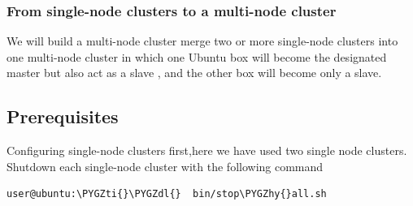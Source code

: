 \documentclass[letterpaper,10pt,english]{sphinxmanual}
\def\PYGZdl{\char`\$}
\def\PYGZhy{\char`\-}
\def\PYGZti{\char`\~}
\begin{document}
\subsubsection{From single-node clusters to a multi-node cluster}
\label{hadoop:from-single-node-clusters-to-a-multi-node-cluster}
We will build a multi-node cluster merge two or more single-node clusters into one multi-node cluster in which one Ubuntu box will become the designated master but also act as a slave , and the other box will become only a slave.
\begin{figure}[htbp]
\centering

\end{figure}


\subsection{Prerequisites}
\label{hadoop:id5}
Configuring single-node clusters first,here we have used two single node clusters.
Shutdown each single-node cluster with the following command

\begin{Verbatim}[commandchars=\\\{\}]
user@ubuntu:\PYGZti{}\PYGZdl{}  bin/stop\PYGZhy{}all.sh
\end{Verbatim}
\end{document}
